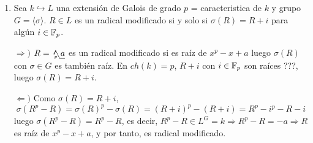 \begin{enumerate}
\begin{dem}
        Sea $p$ epiyectiva
     $$\bt H_i \rar[phantom]{\subset} \arrow{d}{p} &[-8mm] G \arrow{d}{p} \\ p(H_i) = \bar H_i \rar[phantom]{\subset} &[-8mm] G/H \et \qquad \bt H_i \rar[phantom]{\subset} \arrow{d}{p} &[-8mm] H_{i+1} \arrow{d}{p} \\ \bar H_i \rar[phantom]{\subset} &[-8mm] \bar H_{i+1} \et$$
     y por tanto es normal, y es c\'iclico porque si $H_{i+1} / H_i \overset{p}{\longrightarrow} \bar H_{i+1} / \bar H_i$ es epiyectiva con $p([a]) = [p(a)]$ y  $\langle \sigma \rangle = H_{i+1} / H_i$, entonces $\langle p(\sigma) \rangle = \bar H_{i+1} / \bar H_i$.

     $\Leftarrow)$ Sea $H$ resoluble con $H_o = \{1\} \subset H_1 \subset \cdots \subset H_k = H$ con $H_{i+1} / H_i$ c\'iclico, $\{1\} = \bar H_k \subset \bar H_{k+1} \subset \cdots \subset \bar H_n = G/H$ es una cadena de modo que $\bar H_{k+1} / \bar H_{k}$ es c\'iclico. Consideramos $p: G \longrightarrow G/H$ y como es epiyectiva, consideramos la cadena 
     $$H_k = p^{-1}(\bar H_k) \subset  p^{-1}(\bar H_{k+1}) \subset \cdots \subset  p^{-1}(\bar H_n) = G$$
     y $ p^{-1}(\bar H_{i+1}) /  p^{-1}(\bar H_i) \overset{p}{\longrightarrow} \bar H_{i+1} / \bar H_i$ es un morfismo epiyectivo y adem\'as es inyectivo pues si $[z] \longmapsto p(\bar z) = [p(z)] =  [1] \Rightarrow p(z) \in \bar H_i$, por lo que $z \in p^{-1}(H_i)\Rightarrow [z]=\{1\}$, por lo que es isomorfismo, y $p^{-1}(\bar H_{i+1}) /  p^{-1}(\bar H_i) $ es c\'iclico si $\bar H_{i+1} / \bar H_i$. 
\end{dem}
    \item Sea $k \hookrightarrow L$ una extensi\'on de Galois de grado $p$ = caracteristica de $k$ y grupo $G =\langle \sigma\rangle$. $R \in L$ es un radical modificado si y solo si $\sigma(R) = R + i$ para alg\'un $i \in \mathbb{F}_p$.
    \begin{dem}
    $\Rightarrow)$ $R = \usqrt[p]{a}$ es un radical modificado si es ra\'iz de $x^p-x+a$ luego $\sigma(R)$ con $\sigma \in G$ es tambi\'en ra\'iz. En $ch(k)=p$, $R+i$ con $i \in \mathbb{F}_p$ son ra\'ices ???, luego $\sigma(R)=R+i$.

    $\Leftarrow)$ Como $\sigma(R) = R+i$, 
    $$\sigma(R^p-R) = \sigma(R)^p - \sigma(R) = (R+i)^p - (R+i) = R^p - i^p - R - i$$
    luego $\sigma(R^p-R) = R^p - R$, es decir, $R^p-R \in L^G = k \Rightarrow R^p-R = -a \Rightarrow R$ es ra\'iz de $x^p-x+a$, y por tanto, es radical modificado. 
    \end{dem}
\end{enumerate}
